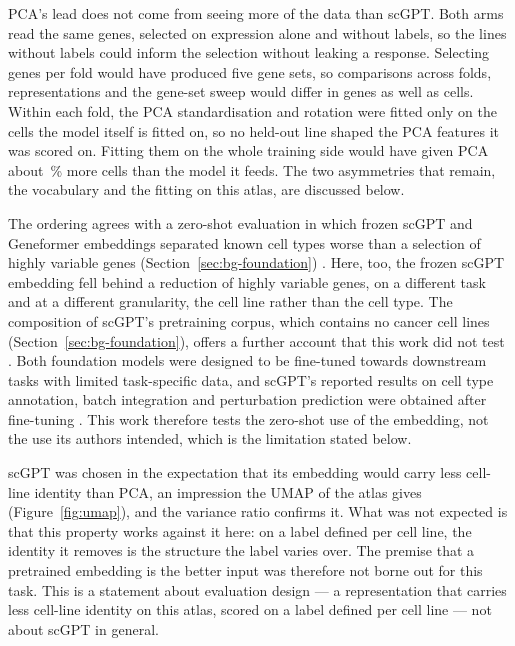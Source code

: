 PCA's lead does not come from seeing more of the data than scGPT. Both arms read the same \NHvg{} genes,
selected on expression alone and without labels, so the lines without labels could inform the selection
without leaking a response. Selecting genes per fold would have produced five gene sets, so comparisons
across folds, representations and the gene-set sweep would differ in genes as well as cells. Within each
fold, the PCA standardisation and rotation were fitted only on the cells the model itself is fitted on,
so no held-out line shaped the PCA features it was scored on. Fitting them on the whole training side
would have given PCA about \CfgExtraPct\,\% more cells than the model it feeds. The two asymmetries that
remain, the vocabulary and the fitting on this atlas, are discussed below.

The ordering agrees with a zero-shot evaluation in
which frozen scGPT and Geneformer embeddings separated known cell types worse
than a selection of highly variable genes (Section~\ref{sec:bg-foundation}) \cite{kedzierska2025}. Here, too, the
frozen scGPT embedding fell behind a reduction of highly variable genes, on a different task and at a
different granularity, the cell line rather than the cell type. The composition of scGPT's
pretraining corpus, which contains no cancer cell lines (Section~\ref{sec:bg-foundation}), offers a
further account that this work did not test \cite{scgpt}. Both foundation models
were designed to be fine-tuned towards downstream tasks with limited task-specific data, and scGPT's
reported results on cell type annotation, batch integration and perturbation prediction were obtained
after fine-tuning \cite{scgpt,theodoris2023}. This work therefore tests the zero-shot use of the
embedding, not the use its authors intended, which is the limitation stated below.

scGPT was chosen in the expectation that its embedding would carry less cell-line identity than PCA, an
impression the UMAP of the atlas gives (Figure~\ref{fig:umap}), and the variance ratio confirms it. What
was not expected is that this property works against it here: on a label defined per cell line, the
identity it removes is the structure the label varies over. The premise that a pretrained embedding is
the better input was therefore not borne out for this task. This is a statement about evaluation design
--- a representation that carries less cell-line identity on this atlas, scored on a label defined per
cell line --- not about scGPT in general.

